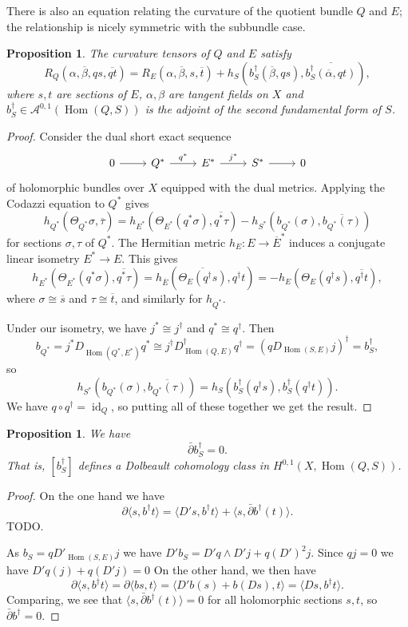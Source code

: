 \documentclass[10pt,a4paper]{article}
\newtheorem{prop}[theo]{Proposition}
\newtheorem*{proof}{Proof}
\newcommand{\cc}[1]{\mathcal{#1}}
\def\ov#1{\overline{#1}}
\DeclareMathOperator{\Hom}{Hom}
\DeclareMathOperator{\id}{id}
\begin{document}
There is also an equation relating the curvature of the quotient bundle $Q$ and $E$; the relationship is nicely symmetric with the subbundle case.

\begin{prop}
The curvature tensors of $Q$ and $E$ satisfy
\[
R_Q(\alpha,\ov\beta,q s, \ov{q t})
= R_{E}(\alpha,\ov\beta,s,\ov t)
+ h_S(b_S^\dagger(\ov\beta,q s),\ov{ b_S^\dagger(\ov\alpha,q t)}),
\]
where $s, t$ are sections of $E$, $\alpha,\beta$ are tangent fields on
$X$ and $b_S^\dagger \in \cc A^{0,1}(\Hom(Q,S))$ is the adjoint of the second
fundamental form of $S$.
\end{prop}

\begin{proof}
Consider the dual short exact sequence
\[
\begin{tikzcd}
0 \arrow[r] & Q^* \arrow[r,"q^*"] & E^* \arrow[r,"j^*"]  & S^* \arrow[r] & 0
\end{tikzcd}
\]
of holomorphic bundles over $X$ equipped with the dual metrics.
Applying the Codazzi equation to $Q^*$ gives
$$
h_{Q^*}(\Theta_{Q^*} \sigma, \ov \tau)
= h_{E^*}(\Theta_{E^*} (q^* \sigma),\ov{ q^* \tau})
- h_{S^*}(b_{Q^*}(\sigma), \ov{b_{Q^*}(\tau)})
$$
for sections $\sigma,\tau$ of $Q^*$. The Hermitian metric $h_E : E \to \ov E^*$ induces a conjugate linear isometry $E^* \to E$. This gives
\[
h_{E^*}(\Theta_{E^*} (q^* \sigma),\ov{ q^* \tau})
= h_{\ov E}(\ov{\Theta_{E} (q^\dagger s)}, q^\dagger t)
= -h_{E}(\Theta_{E} (q^\dagger s), \ov{q^\dagger t}),
\]
where $\sigma \cong \ov s$ and $\tau \cong \ov t$,
and similarly for $h_{Q^*}$.

Under our isometry, we have $j^* \cong j^\dagger$ and $q^* \cong q^\dagger$. Then
\[
b_{Q^*}
= j^*D_{\Hom(Q^*,E^*)}q^*
\cong j^\dagger D_{\Hom(Q,E)}^\dagger q^\dagger
= (q D_{\Hom(S,E)} j)^\dagger
= b_S^\dagger,
\]
so
\[
h_{S^*}(b_{Q^*}(\sigma), \ov{b_{Q^*}(\tau)})
= h_{S}(b_S^\dagger(q^\dagger s), b_S^\dagger(q^\dagger t)).
\]
We have $q \circ q^\dagger = \id_Q$, so putting all of these together we get the result.
\end{proof}



\begin{prop}
We have
\[
\bar\partial b_S^\dagger = 0.
\]
That is, $[b_S^\dagger]$ defines a Dolbeault cohomology class in $H^{0,1}(X, \Hom(Q,S))$.
\end{prop}

\begin{proof}
On the one hand we have
\[
\partial \langle s, b^\dagger t \rangle
= \langle D's, b^\dagger t \rangle
+ \langle s, \bar\partial b^\dagger (t) \rangle.
\]
TODO.

As $b_S = qD'_{\Hom(S,E)}j$ we have $D'b_S = D'q \wedge D'j + q(D')^2j$. Since $qj = 0$ we have $D'q(j) + q(D'j) = 0$ On the other hand, we then have
\[
\partial \langle s, b^\dagger t \rangle
= \partial \langle b s, t \rangle
= \langle D'b (s) + b(Ds), t \rangle
= \langle Ds, b^\dagger t \rangle.
\]
Comparing, we see that $\langle s, \bar\partial b^\dagger (t) \rangle = 0$ for all holomorphic sections $s,t$, so $\bar\partial b^\dagger = 0$.
\end{proof}
\end{document}

